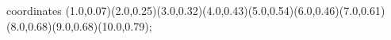					coordinates { (1.0,0.07)(2.0,0.25)(3.0,0.32)(4.0,0.43)(5.0,0.54)(6.0,0.46)(7.0,0.61)(8.0,0.68)(9.0,0.68)(10.0,0.79)};
